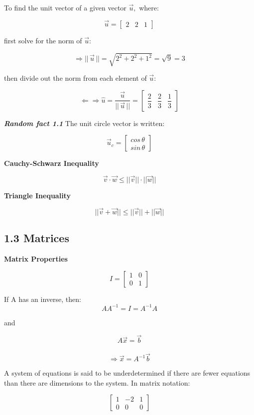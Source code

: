 \documentclass{article}
\begin{document}
To find the unit vector of a given vector \(\vec{u},\) where:

\[\vec{u} = \begin{bmatrix} 2 & 2 & 1 \end{bmatrix} \]

first solve for the norm of \(\vec{u}:\)

\[\Rightarrow || \, \vec{u} \, || = \sqrt{2^2 + 2^2 +1^2} = \sqrt{9} = 3\]

then divide out the norm from each element of \(\vec{u}:\)

\[ \Leftarrow\Rightarrow \hat{u} = \dfrac{\vec{u}}{||\, \vec{u} \,||} = \begin{bmatrix} \dfrac{2}{3} & \dfrac{2}{3} & \dfrac{1}{3} \end{bmatrix}\]

\textbf{\emph{Random fact 1.1}} The unit circle vector is written:

\[\vec{u}_c = \begin{bmatrix} cos \, \theta \\ sin \, \theta \end{bmatrix}\]

    \textbf{Cauchy-Schwarz Inequality}

\[ \vec{v} \cdot \vec{w} \leq || \vec{v} || \cdot || \vec{w} ||\]

\textbf{Triangle Inequality}

\[ || \vec{v} + \vec{w} || \leq ||\vec{v}|| + ||\vec{w}||\]

    \subsection{1.3 Matrices}\label{matrices}

    \textbf{Matrix Properties}

\[ I = \begin{bmatrix} 1 & 0 \\ 0 & 1 \end{bmatrix}\]

If A has an inverse, then: \[ AA^{-1} = I = A^{-1}A\]

and

\[ A\vec{x} = \vec{b} \]\\
\[ \Rightarrow \vec{x} = A^{-1} \vec{b} \]

A system of equations is said to be underdetermined if there are fewer
equations than there are dimensions to the system. In matrix notation:

\[\left[\begin{array}{cc|c} 1 & -2 & 1 \\ 0 & 0 & 0 \end{array}\right]\]
\end{document}
